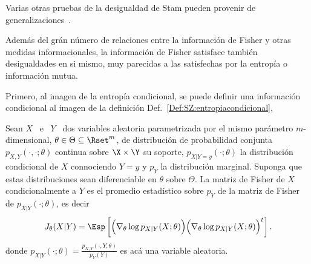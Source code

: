Varias   otras  pruebas   de  la   desigualdad  de   Stam  pueden   provenir  de
generalizaciones~\cite{Ber12:06_1, Ber13, LutYan05, LutLv12, ZozPue17}.



\label{Sssec:SZ:FisherIneq}

Adem\'as del  gr\'an n\'umero de relaciones  entre la informaci\'on  de Fisher y
otras medidas  informacionales, la  informaci\'on de Fisher  satisface tambi\'en
desigualdades en si  mismo, muy parecidas a las satisfechas  por la entrop\'ia o
informaci\'on mutua.

Primero,  al  imagen  de  la   entrop\'ia  condicional,  se  puede  definir  una
informaci\'on         condicional         al         imagen        de         la
definici\'on Def.~\ref{Def:SZ:entropiacondicional},
%
\begin{definicion}
\label{Def:SZ:MatrizFisherParametricaCondicional}
%
  Sean  $X$ \  e \  $Y$ \  dos variables  aleatoria parametrizada  por  el mismo
  par\'ametro  $m$-dimensional,  $\theta   \in  \Theta  \subseteq  \Rset^m$,  de
  distribuci\'on de probabilidad conjunta $p_{X,Y}(\cdot,\cdot;\theta)$ continua
  sobre   $\X   \times   \Y$   su  soporte,   $p_{X|Y=y}(\cdot;\theta)$   la
  distribuci\'on condicional  de $X$ connociendo  $Y=y$ y $p_Y$  la distribuci\'on
  marginal.  Suponga que  estas  distribuciones sean  diferenciable en  $\theta$
  sobre  $\Theta$.  La  matriz de  Fisher de  $X$ condicionalmente  a $Y$  es el
  promedio   estad\'istico   sobre   $p_Y$   de   la   matriz   de   Fisher   de
  $p_{X|Y}(\cdot;\theta)$, es decir
  \[
  J_\theta(X|Y)  = \Esp\left[ \Big(  \nabla_\theta \log  p_{X|Y}(X;\theta) \Big)
    \Big( \nabla_\theta \log p_{X|Y}(X;\theta) \Big)^t \right].
  \]
  donde  $p_{X|Y}(\cdot;\theta)   =  \frac{p_{X,Y}(\cdot,Y;\theta)}{p_Y(Y)}$  es
  ac\'a una variable aleatoria.
\end{definicion}

